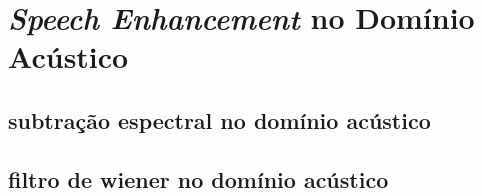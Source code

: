 \section{\textit{Speech Enhancement} no Domínio Acústico}
\subsection{subtração espectral no domínio acústico}
\subsection{filtro de wiener no domínio acústico}